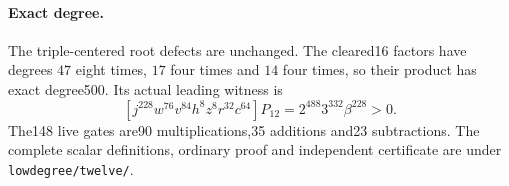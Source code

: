 \paragraph{Exact degree.}
The triple-centered root defects are unchanged.  The cleared16 factors
have degrees $47$ eight times, $17$ four times and $14$ four times,
so their product has exact degree500.  Its actual leading witness is
\[
 [j^{228}w^{76}v^{84}h^8z^8r^{32}c^{64}]P_{12}
   =2^{488}3^{332}\beta^{228}>0.
\]
The148 live gates are90 multiplications,35 additions and23 subtractions.
The complete scalar definitions, ordinary proof and independent certificate
are under \texttt{lowdegree/twelve/}.
